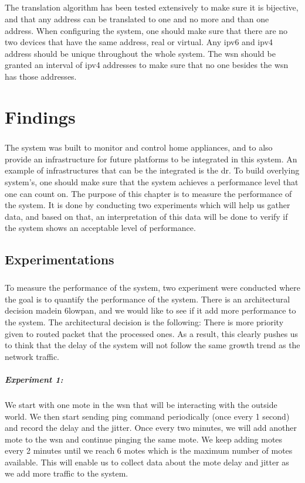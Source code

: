 \documentclass[oneside,12pt,a4paper,final]{book}
\begin{document}
\paragraph{}
The translation algorithm has been tested extensively to make sure it is bijective, and that any address can be translated to one and no more and than one address. When configuring the system, one should make sure that there are no two devices that have the same address, real or virtual. Any \gls{ipv6} and \gls{ipv4} address should be unique throughout the whole system. The \gls{wsn} should be granted an interval of \gls{ipv4} addresses to make sure that no one besides the \gls{wsn} has those addresses.


\chapter{Findings}
\paragraph{}
The system was built to monitor and control home appliances, and to also provide an infrastructure for future platforms to be integrated in this system. An example of infrastructures that can be the integrated is the \gls{dr}. To build overlying system's, one should make sure that the system achieves a performance level that one can count on. The purpose of this chapter is to measure the performance of the system. It is done by conducting two experiments which will help us gather data, and based on that, an interpretation of this data will be done to verify if the system shows an acceptable level of performance.
\section{Experimentations}
\paragraph{}
To measure the performance of the system, two experiment were conducted where the goal is to quantify the performance of the system. There is an architectural decision madein \gls{6lowpan}, and we would like to see if it add more performance to the system. The architectural decision is the following: There is more priority given to routed packet that the processed ones. As a result, this clearly pushes us to think that the delay of the system will not follow the same growth trend as the network traffic.
\paragraph{Experiment 1:}
We start with one mote in the \gls{wsn} that will be interacting with the outside world. We then start sending ping command periodically (once every 1 second) and record the delay and the jitter. Once every two minutes, we will add another mote to the \gls{wsn} and continue pinging the same mote. We keep adding motes every 2 minutes until we reach 6 motes which is the maximum number of motes available. This will enable us to collect data about the mote delay and jitter as we add more traffic to the system.
\end{document}
